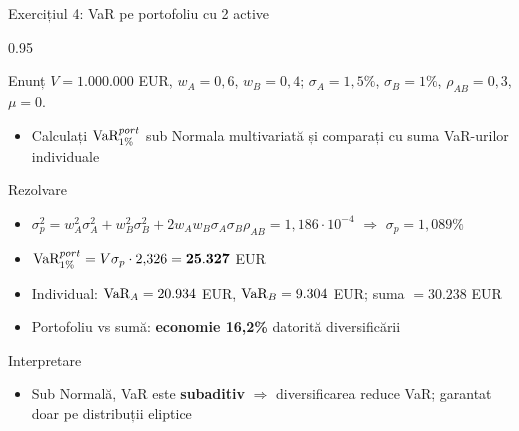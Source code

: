 \documentclass[9pt, aspectratio=169, t]{beamer}
\begin{document}
\begin{frame}[shrink=10]{Exercițiul 4: VaR pe portofoliu cu 2 active}
    \begin{cminipage}{0.95\textwidth}
    \begin{block}{Enunț}
    $V = 1.000.000$ EUR, $w_A = 0{,}6$, $w_B = 0{,}4$; $\sigma_A = 1{,}5\%$, $\sigma_B = 1\%$, $\rho_{AB} = 0{,}3$, $\mu = 0$.
    \begin{itemize}\setlength{\itemsep}{0pt}
        \item Calculați $\text{VaR}_{1\%}^{port}$ sub Normala multivariată și comparați cu suma VaR-urilor individuale
    \end{itemize}
    \end{block}
    \begin{exampleblock}{Rezolvare}
    \begin{itemize}\setlength{\itemsep}{0pt}
        \item $\sigma_p^2 = w_A^2\sigma_A^2 + w_B^2\sigma_B^2 + 2w_A w_B \sigma_A \sigma_B \rho_{AB} = 1{,}186 \cdot 10^{-4}$ $\Rightarrow$ $\sigma_p = 1{,}089\%$
        \item $\text{VaR}_{1\%}^{port} = V \sigma_p \cdot 2{,}326 = \mathbf{25.327}$ EUR
        \item Individual: $\text{VaR}_A = 20.934$ EUR, $\text{VaR}_B = 9.304$ EUR; suma $= 30.238$ EUR
        \item Portofoliu vs sumă: \textbf{economie 16{,}2\%} datorită diversificării
    \end{itemize}
    \end{exampleblock}
    \begin{alertblock}{Interpretare}
    \begin{itemize}\setlength{\itemsep}{0pt}
        \item Sub Normală, VaR este \textbf{subaditiv} $\Rightarrow$ diversificarea reduce VaR; garantat doar pe distribuții eliptice
    \end{itemize}
    \end{alertblock}
    \end{cminipage}
\end{frame}
\end{document}

